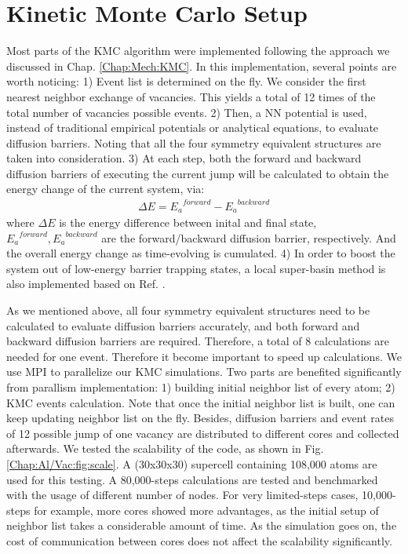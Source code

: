 \newpage
\section{Kinetic Monte Carlo Setup}
\label{Chap:Al/Vac:section:KMC}

Most parts of the \ac{KMC} algorithm were implemented following the approach we discussed in Chap. \ref{Chap:Mech:KMC}. In this implementation, several points are worth noticing: 1) Event list is determined on the fly. We consider the first nearest neighbor exchange of vacancies. This yields a total of 12 times of the total number of vacancies possible events. 2) Then, a \ac{NN} potential is used, instead of traditional empirical potentials or analytical equations, to evaluate diffusion barriers. Noting that all the four symmetry equivalent structures are taken into consideration. 3) At each step, both the forward and backward diffusion barriers of executing the current jump will be calculated to obtain the energy change of the current system, via:
\begin{subequations}
\begin{align}
\Delta E = {E_a}^{forward} - {E_a}^{backward}
\label{Chap:Al/Vac:eq:barrier-EDiff}
\end{align}
\end{subequations}
where $\Delta E$ is the energy difference between inital and final state, ${E_a}^{forward}, {E_a}^{backward}$ are the forward/backward diffusion barrier, respectively. And the overall energy change as time-evolving is cumulated. 4) In order to boost the system out of low-energy barrier trapping states, a local super-basin method is also implemented based on Ref. \cite{fichthorn2013local}.

As we mentioned above, all four symmetry equivalent structures need to be calculated to evaluate diffusion barriers accurately, and both forward and backward diffusion barriers are required. Therefore, a total of 8 calculations are needed for one event. Therefore it become important to speed up calculations. We use \ac{MPI} to parallelize our \ac{KMC} simulations. Two parts are benefited significantly from parallism implementation: 1) building initial neighbor list of every atom; 2) \ac{KMC} events calculation. Note that once the initial neighbor list is built, one can keep updating neighbor list on the fly. Besides, diffusion barriers and event rates of 12 possible jump of one vacancy are distributed to different cores and collected afterwards. We tested the scalability of the code, as shown in Fig. \ref{Chap:Al/Vac:fig:scale}. A (30x30x30) supercell containing 108,000 atoms are used for this testing. A 80,000-steps calculations are tested and benchmarked with the usage of different number of nodes. For very limited-steps cases, 10,000-steps for example, more cores showed more advantages, as the initial setup of neighbor list takes a considerable amount of time. As the simulation goes on, the cost of communication between cores does not affect the scalability significantly.

